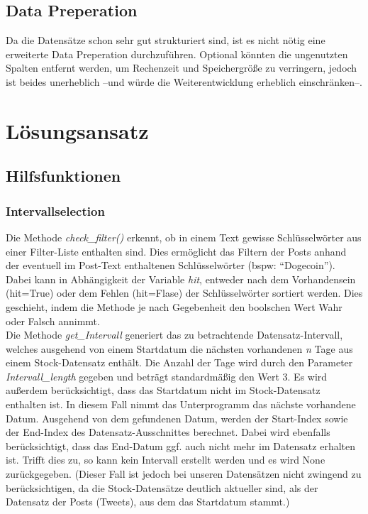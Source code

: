 \documentclass{article}
\begin{document}
\subsection{Data Preperation}
Da die Datensätze schon sehr gut strukturiert sind, ist es nicht nötig eine erweiterte Data Preperation durchzuführen.
Optional könnten die ungenutzten Spalten entfernt werden, um Rechenzeit und Speichergröße zu verringern, jedoch ist beides unerheblich --und würde die Weiterentwicklung erheblich einschränken--.



\section{Lösungsansatz}


\subsection{Hilfsfunktionen}

\subsubsection{Intervallselection}
Die Methode \textit{check\_filter()} erkennt, ob in einem Text gewisse Schlüsselwörter aus einer Filter-Liste enthalten sind.
Dies ermöglicht das Filtern der Posts anhand der eventuell im Post-Text enthaltenen Schlüsselwörter (bspw: ``Dogecoin'').
Dabei kann in Abhängigkeit der Variable \textit{hit}, entweder nach dem Vorhandensein (hit=True) oder dem Fehlen (hit=Flase) der Schlüsselwörter sortiert werden.
Dies geschieht, indem die Methode je nach Gegebenheit den boolschen Wert Wahr oder Falsch annimmt.
\\
Die Methode \textit{get\_Intervall} generiert das zu betrachtende Datensatz-Intervall, welches ausgehend von einem Startdatum die nächsten vorhandenen \textit{n} Tage aus einem Stock-Datensatz enthält.
Die Anzahl der Tage wird durch den Parameter \textit{Intervall\_length} gegeben und beträgt standardmäßig den Wert 3.
Es wird außerdem berücksichtigt, dass das Startdatum nicht im Stock-Datensatz enthalten ist.
In diesem Fall nimmt das Unterprogramm das nächste vorhandene Datum.
Ausgehend von dem gefundenen Datum, werden der Start-Index sowie der End-Index des Datensatz-Ausschnittes berechnet.
Dabei wird ebenfalls berücksichtigt, dass das End-Datum ggf. auch nicht mehr im Datensatz erhalten ist. Trifft dies zu, so kann kein Intervall erstellt werden und es wird None zurückgegeben.
(Dieser Fall ist jedoch bei unseren Datensätzen nicht zwingend zu berücksichtigen, da die Stock-Datensätze deutlich aktueller sind, als der Datensatz der Posts (Tweets), aus dem das Startdatum stammt.)
\end{document}
